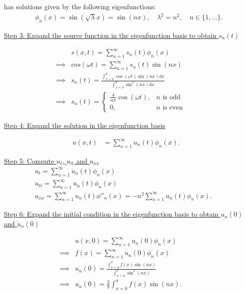 \documentclass{article}
\begin{document}
has solutions given by the following eigenfunctions:
\begin{align*}
  &\phi_n(x) = \sin(\sqrt{\lambda} x) = \sin(n x), \quad \lambda^2 = n^2, \quad n \in \{1, \ldots\}.
\end{align*}

\noindent
\underline{Step 3: Expand the source function in the eigenfunction basis to obtain $s_n(t)$}
\newline

\begin{align*}
  &s(x, t) = \sum_{n=1}^{\infty} s_n(t) \phi_n(x) &&\\
  \implies&cos(\omega t) = \sum_{n=1}^{\infty} s_n(t) \sin(n x) &&\\
  \implies&s_n(t) = \frac{\int_{x=0}^{\pi} \cos(\omega t) \sin(n x) dx}{\int_{x=0}^{\pi} \sin^2(n x) dx} &&\\
  \implies& s_n(t) = \begin{cases}
    \frac{4}{n \pi} \cos(\omega t), &n \text{ is odd} \\
    0, &n \text{ is even}
  \end{cases}
\end{align*}


\noindent
\underline{Step 4: Expand the solution in the eigenfunction basis}
\newline

\begin{align*}
  u(x, t) &= \sum_{n=1}^{\infty} u_n(t) \phi_n(x).
\end{align*}

\noindent
\underline{Step 5: Compute $u_{t}$, $u_{tt}$ and $u_{xx}$}
\newline
\begin{align*}
  &u_{t} = \sum_{n=1}^{\infty} \dot{u}_n(t) \phi_n(x) &&\\
  &u_{tt} = \sum_{n=1}^{\infty} \ddot{u}_n(t) \phi_n(x) &&\\
  &u_{xx} = \sum_{n=1}^{\infty} u_n(t) \phi''_n(x) = - n^2 \sum_{n=1}^{\infty} u_n(t) \phi_n(x).
\end{align*}

\noindent
\underline{Step 6: Expand the initial condition in the eigenfunction basis to obtain $u_n(0)$ and $\dot{u}_n(0)$}
\newline

\begin{align*}
  &u(x, 0) = \sum_{n=1}^{\infty} u_n(0) \phi_n(x) &&\\
  \implies& f(x) = \sum_{n=1}^{\infty} u_n(0) \phi_n(x) &&\\
  \implies& u_n(0) = \frac{\int_{x=0}^{\pi} f(x) \sin(nx)}{\int_{x=0}^{\pi} \sin^2(nx)} &&\\
  \implies& u_n(0) = \frac{2}{\pi} \int_{x=0}^{\pi} f(x) \sin(nx).
\end{align*}
\end{document}
